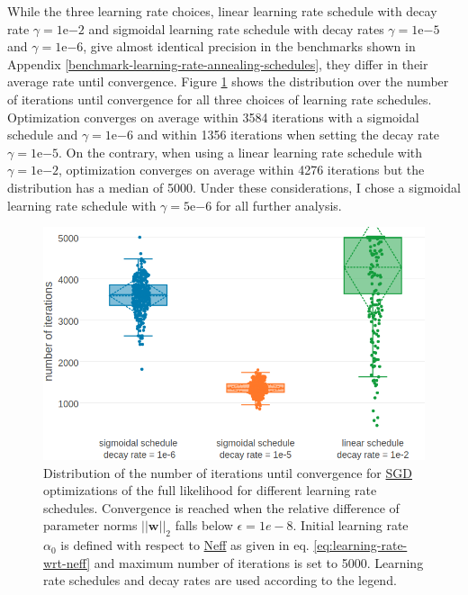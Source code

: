 \documentclass[12pt,a4paper,twoside]{book}
\newcommand{\eq}{\!=\!}
\newcommand{\w}{\mathbf{w}}
\theoremstyle{definition}
\theoremstyle{definition}
\theoremstyle{remark}
\begin{document}
While the three learning rate choices, linear learning rate schedule
with decay rate \(\gamma \eq 1\mathrm{e}{-2}\) and sigmoidal learning
rate schedule with decay rates \(\gamma \eq 1\mathrm{e}{-5}\) and
\(\gamma \eq 1\mathrm{e}{-6}\), give almost identical precision in the
benchmarks shown in Appendix
\ref{benchmark-learning-rate-annealing-schedules}, they differ in their
average rate until convergence. Figure
\ref{fig:distribution-num-iterations} shows the distribution over the
number of iterations until convergence for all three choices of learning
rate schedules. Optimization converges on average within 3584 iterations
with a sigmoidal schedule and \(\gamma \eq 1\mathrm{e}{-6}\) and within
1356 iterations when setting the decay rate
\(\gamma \eq 1\mathrm{e}{-5}\). On the contrary, when using a linear
learning rate schedule with \(\gamma \eq 1\mathrm{e}{-2}\), optimization
converges on average within 4276 iterations but the distribution has a
median of 5000. Under these considerations, I chose a sigmoidal learning
rate schedule with \(\gamma \eq 5\mathrm{e}{-6}\) for all further
analysis.












\begin{figure}

{\centering \includegraphics[width=1\linewidth]{img/full_likelihood/sgd/distribution_numiterations_against_selected_learningrate_schedules} 

}

\caption{Distribution of the number of
iterations until convergence for \protect\hyperlink{abbrev}{SGD}
optimizations of the full likelihood for different learning rate
schedules. Convergence is reached when the relative difference of
parameter norms \(||\w||_2\) falls below \(\epsilon \eq 1e-8\). Initial
learning rate \(\alpha_0\) is defined with respect to
\protect\hyperlink{abbrev}{Neff} as given in eq.
\eqref{eq:learning-rate-wrt-neff} and maximum number of iterations is set
to 5000. Learning rate schedules and decay rates are used according to
the legend.}\label{fig:distribution-num-iterations}
\end{figure}
\end{document}
